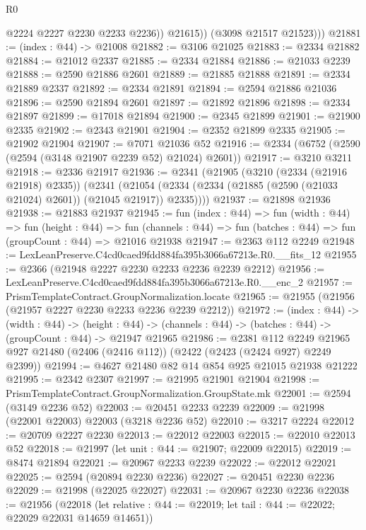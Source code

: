 \begin{lexlean}{R0}
\begin{coremodule}
                @2224
                @2227
                @2230
                @2233
                @2236))
            @21615))
        (@3098 @21517 @21523)))
@21881 := (index : @44) -> @21008
@21882 := @3106 @21025
@21883 := @2334 @21882
@21884 := @21012 @2337
@21885 := @2334 @21884
@21886 := @21033 @2239
@21888 := @2590 @21886 @2601
@21889 := @21885 @21888
@21891 := @2334 @21889 @2337
@21892 := @2334 @21891
@21894 := @2594 @21886 @21036
@21896 := @2590 @21894 @2601
@21897 := @21892 @21896
@21898 := @2334 @21897
@21899 := @17018 @21894
@21900 := @2345 @21899
@21901 := @21900 @2335
@21902 := @2343 @21901
@21904 := @2352 @21899 @2335
@21905 := @21902 @21904
@21907 := @7071 @21036 @52
@21916 := @2334 (@6752 (@2590 (@2594 (@3148 @21907 @2239 @52) @21024) @2601))
@21917 := @3210 @3211
@21918 := @2336 @21917
@21936 := @2341
    (@21905
      (@3210 (@2334 (@21916 @21918) @2335))
      (@2341 (@21054 (@2334 (@2334 (@21885 (@2590 (@21033 @21024) @2601)) (@21045 @21917)) @2335))))
@21937 := @21898 @21936
@21938 := @21883 @21937
@21945 := fun (index : @44) =>
  fun (width : @44) =>
  fun (height : @44) =>
  fun (channels : @44) => fun (batches : @44) => fun (groupCount : @44) => @21016 @21938
@21947 := @2363 @112 @2249
@21948 := LexLeanPreserve.C4cd0caed9fdd884fa395b3066a67213e.R0.__fits_12
@21955 := @2366 (@21948 @2227 @2230 @2233 @2236 @2239 @2212)
@21956 := LexLeanPreserve.C4cd0caed9fdd884fa395b3066a67213e.R0.__enc_2
@21957 := PrismTemplateContract.GroupNormalization.locate
@21965 := @21955 (@21956 (@21957 @2227 @2230 @2233 @2236 @2239 @2212))
@21972 := (index : @44) ->
  (width : @44) ->
  (height : @44) -> (channels : @44) -> (batches : @44) -> (groupCount : @44) -> @21947 @21965
@21986 := @2381
    @112
    @2249
    @21965
    @927
    @21480
    (@2406 (@2416 @112))
    (@2422 (@2423 (@2424 @927) @2249 @2399))
@21994 := @4627 @21480 @82 @14 @854 @925 @21015 @21938 @21222
@21995 := @2342 @2307
@21997 := @21995 @21901 @21904
@21998 := PrismTemplateContract.GroupNormalization.GroupState.mk
@22001 := @2594 (@3149 @2236 @52)
@22003 := @20451 @2233 @2239
@22009 := @21998 (@22001 @22003) @22003 (@3218 @2236 @52)
@22010 := @3217 @2224
@22012 := @20709 @2227 @2230
@22013 := @22012 @22003
@22015 := @22010 @22013 @52
@22018 := @21997 (let unit : @44 := @21907; @22009 @22015)
@22019 := @8474 @21894
@22021 := @20967 @2233 @2239
@22022 := @22012 @22021
@22025 := @2594 (@20894 @2230 @2236)
@22027 := @20451 @2230 @2236
@22029 := @21998 (@22025 @22027)
@22031 := @20967 @2230 @2236
@22038 := @21956
    (@22018 (let relative : @44 := @22019; let tail : @44 := @22022; @22029 @22031 @14659 @14651))

\end{coremodule}
\end{lexlean}
